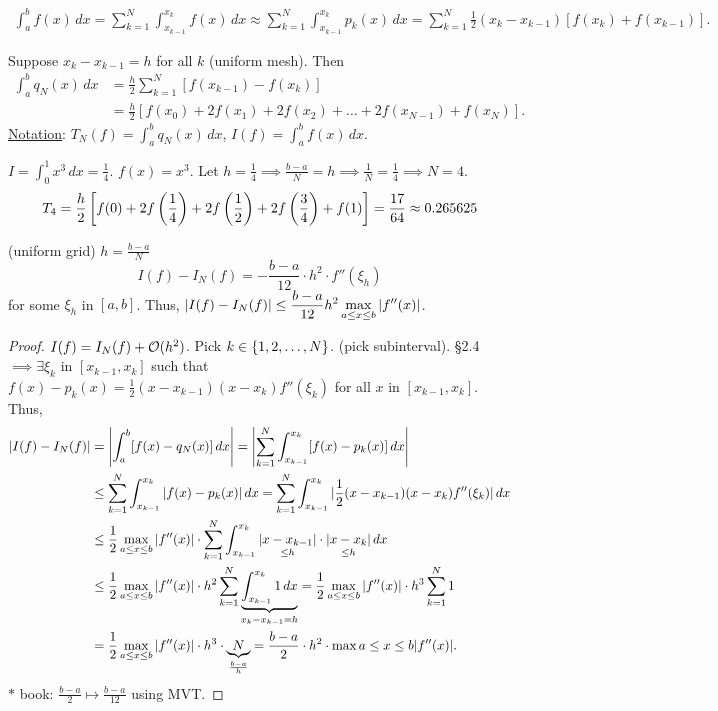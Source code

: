 \documentclass[]{article}
\begin{document}
\begin{proposition}
	\begin{align*}
		\int_a^b f(x)\,dx = \sum_{k=1}^N\int_{x_{k-1}}^{x_k}f(x)\,dx 
						  \approx \sum_{k=1}^N \int_{x_{k-1}}^{x_k} p_k(x)\,dx
						  = \sum_{k=1}^N\frac12(x_k-x_{k-1}) [f(x_k)+f(x_{k-1})].
	\end{align*}
\end{proposition}
Suppose $x_k-x_{k-1}=h$ for all $k$ (uniform mesh).
Then 
\begin{align*}
	\int_a^b q_N(x)\,dx &= \frac h2\sum_{k=1}^N[f(x_{k-1})-f(x_k)] \\
						&= \frac h2[f(x_0)+2f(x_1)+2f(x_2)+\dots+2f(x_{N-1})+f(x_N)].
\end{align*}
\ul{Notation}: $T_N(f) = \int_a^b q_N(x)\,dx$, $I(f) = \int_a^bf(x)\,dx$.
\begin{example}
	$I = \int_0^1x^3\,dx = \frac14$. $f(x)=x^3$.
	Let $h=\frac14 \implies \frac{b-a}N=h \implies \frac1N=\frac14 \implies N=4$.
	\begin{align*}
		T_4 = \frac h2\blr{f(0) + 2f\plr{\frac14} + 2f\plr{\frac12} + 2f\plr{\frac34} + f(1)} 
			= \frac{17}{64} \approx 0.265625
	\end{align*}
\end{example}
\begin{proposition}
	[Accuracy] (uniform grid) $h=\frac{b-a}N$
	$$ I(f)-I_N(f) = -\frac{b-a}{12}\cdot h^2\cdot f''(\xi_h) $$
	for some $\xi_h$ in $[a,b]$.
	Thus, $\ds|I(f)-I_N(f)|\leq \frac{b-a}{12}h^2 \max_{a\leq x\leq b}|f''(x)|$.
\end{proposition}
\begin{proof}
	$I(f)=I_N(f)+\mc O(h^2)$.
	Pick $k\in\set{1,2,\dots,N}$. (pick subinterval).
	\S2.4 $\implies \exists \xi_k$ in $[x_{k-1},x_k]$ such that $f(x)-p_k(x) = \frac12(x-x_{k-1})(x-x_k)f''(\xi_k)$ for all $x$ in $[x_{k-1},x_k]$.
	Thus,
	\begin{align*}
		|I(f)-I_N(f)| &= \mlr{\int_a^b[f(x)-q_N(x)]\,dx}
					  = \mlr{\sum_{k=1}^N\int_{x_{k-1}}^{x_k} [f(x)-p_k(x)]\,dx} \\
					  &\leq \sum_{k=1}^N\int_{x_{k-1}}^{x_k}|f(x)-p_k(x)|\,dx
					  = \sum_{k=1}^N\int_{x_{k-1}}^{x_k}|\frac12(x-x_{k-1})(x-x_k)f''(\xi_k)|\,dx \\
					  &\leq \frac12\max_{a\leq x\leq b}|f''(x)|\cdot\sum_{k=1}^N\int_{x_{k-1}}^{x_k}\us{\leq h}{|x-x_{k-1}|}\cdot\us{\leq h}{|x-x_k|}\,dx \\
					  &\leq \frac12\max_{a\leq x\leq b}|f''(x)|\cdot h^2\sum_{k=1}^N \ub{x_k-x_{k-1}=h}{\int_{x_{k-1}}^{x_k} 1\,dx}
					  = \frac12\max_{a\leq x\leq b}|f''(x)|\cdot h^3\sum_{k=1}^N1 \\
					  &= \frac12\max_{a\leq x\leq b}|f''(x)|\cdot h^3\cdot \ub{\frac{b-a}h}N
					  = \frac{b-a}2\cdot h^2\cdot\max{a\leq x\leq b}|f''(x)|.
	\end{align*}
	$*$ book: $\frac{b-a}2\mapsto \frac{b-a}{12}$ using MVT.
\end{proof}
\end{document}
